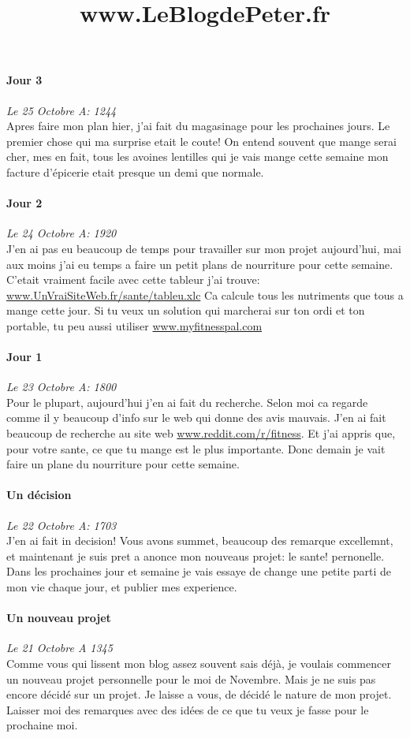 \documentclass{article}
\begin{document}
\title{www.LeBlogdePeter.fr}

\paragraph{Jour 3} \emph{Le 25 Octobre A: 1244}\\
Apres faire mon plan hier, j'ai fait du magasinage pour les prochaines jours. Le premier chose qui ma surprise etait le coute! On entend souvent
que mange serai cher, mes en fait, tous les avoines lentilles qui je vais mange cette semaine mon facture d'épicerie etait presque un demi 
que normale.

\paragraph{Jour 2} \emph{Le 24 Octobre A: 1920}\\
J'en ai pas eu beaucoup de temps pour travailler sur mon projet aujourd'hui, mai aux moins j'ai eu temps a faire un petit plans de nourriture
pour cette semaine. C'etait vraiment facile avec cette tableur j'ai trouve: \underline{www.UnVraiSiteWeb.fr/sante/tableu.xlc} Ca calcule 
tous les nutriments que tous a mange cette jour. Si tu veux un solution qui marcherai sur ton ordi et ton portable, tu peu aussi utiliser 
\underline{www.myfitnesspal.com}

\paragraph{Jour 1} \emph{Le 23 Octobre A: 1800}\\
Pour le plupart, aujourd'hui j'en ai fait du recherche. Selon moi ca regarde comme il y beaucoup d'info sur le web qui donne des avis mauvais.
J'en ai fait beaucoup de recherche au site web \underline{www.reddit.com/r/fitness}. Et j'ai appris que, pour votre sante, ce que tu mange est
le plus importante. Donc demain je vait faire un plane du nourriture pour cette semaine.

\paragraph{Un décision} \emph{Le 22 Octobre A: 1703}\\
J'en ai fait in decision!  Vous avons summet, beaucoup des remarque excellemnt, et maintenant je suis pret a anonce mon nouveaus projet: le sante!  pernonelle. Dans les prochaines jour et semaine je vais essaye de change une petite parti de mon vie chaque jour, et publier mes experience.

\paragraph{Un nouveau projet} \emph{Le 21 Octobre A 1345} \\
Comme vous qui lissent mon blog assez souvent sais déjà, je voulais commencer un nouveau projet personnelle pour le moi de Novembre. Mais je ne suis pas encore décidé sur un projet. Je laisse a vous, de décidé le nature de mon projet. Laisser moi des remarques avec des idées de ce que tu veux je fasse pour le prochaine moi.
\end{document}
